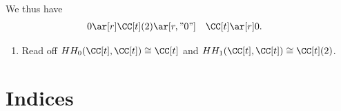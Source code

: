 We thus have \begin{align*}
0 \ar[r] & \CC[t](2) \ar[r, "0"] & \CC[t] \ar[r] & 0
.\end{align*}

\begin{enumerate}
\def\labelenumi{\arabic{enumi}.}
\setcounter{enumi}{2}
\tightlist
\item
  Read off \(HH_0(\CC[t], \CC[t]) \cong \CC[t]\) and
  \(HH_1(\CC[t], \CC[t]) \cong \CC[t](2)\).
\end{enumerate}

\newpage

\newpage
\section{Indices}

\renewcommand{\listtheoremname}{Definitions}
\listoftheorems[ignoreall,show={definition}, numwidth=3.5em]

\renewcommand{\listtheoremname}{Theorems}
\listoftheorems[ignoreall,show={theorem,proposition}, numwidth=3.5em]

\renewcommand{\listtheoremname}{Exercises}
\listoftheorems[ignoreall,show={exercise}, numwidth=3.5em]

\listoffigures


\printbibliography[title=Bibliography]



